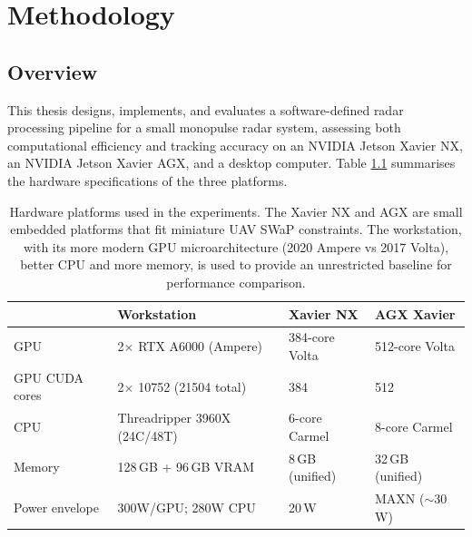 \chapter{Methodology}
\label{sec:methodology}
\section{Overview}
This thesis designs, implements, and evaluates a software-defined radar processing 
pipeline for a small monopulse radar system, assessing both computational efficiency 
and tracking accuracy on an NVIDIA Jetson Xavier NX, an NVIDIA Jetson Xavier AGX, and 
a desktop computer. Table \ref{tab:hardware-specs} summarises the hardware 
specifications of the three platforms. 

\begin{table}[t]
  \centering
  \caption[Hardware platforms used in the experiments]{ Hardware platforms used in the experiments. The Xavier NX and AGX 
    are small embedded platforms that fit miniature UAV SWaP constraints. The workstation, with its more modern GPU 
    microarchitecture (2020 Ampere vs 2017 Volta), better CPU and more memory, is used to provide an unrestricted baseline 
    for performance comparison.}
  \label{tab:hardware-specs}
  \begin{tabular}{@{}llll@{}}
    \hline
     & \textbf{Workstation} & \textbf{Xavier NX} & \textbf{AGX Xavier} \\
    \hline
    GPU            & 2$\times$ RTX A6000 (Ampere) & 384-core Volta        & 512-core Volta \\
    GPU CUDA cores & 2$\times$ 10752 (21504 total)& 384                   & 512 \\
    CPU            & Threadripper 3960X (24C/48T) & 6-core Carmel         & 8-core Carmel \\
    Memory         & 128\,GB + 96\,GB VRAM        & 8\,GB (unified)       & 32\,GB (unified) \\
    Power envelope & 300W/GPU; 280W CPU           & 20\,W                 & MAXN ($\sim$30\,W) \\
    \hline
  \end{tabular}
\end{table}

